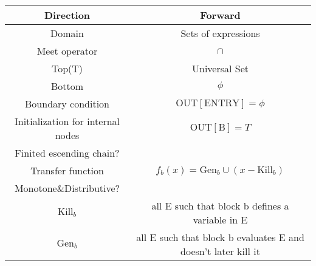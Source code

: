 \begin{center}
	\begin{tabular}{|c|c|}
		\hline Direction                         & Forward                                           \\
		\hline Domain                            & Sets of expressions                                    \\
		\hline Meet operator                     & \( \cap \)                                          \\
		\hline Top(T)                            & Universal Set                                             \\
		\hline Bottom                            & $\phi$                                     \\
		\hline Boundary condition                & $\mathrm{OUT[ENTRY]} = \phi$                          \\
		\hline Initialization for internal nodes & $\mathrm{OUT[B]} = T$                             \\
		\hline Finited escending chain?          & \checkmark                                          \\
		\hline Transfer function                 & $f_b(x) = \mathrm{Gen}_b \cup (x - \mathrm{Kill}_b)$ \\
		\hline Monotone\&Distributive?           & \checkmark                                          \\
		\hline $\mathrm{Kill}_b$ & all E such that block b defines a variable in E \\
    \hline $\mathrm{Gen}_b$ & all E such that block b evaluates E and doesn’t later kill it \\
    \hline
	\end{tabular}
\end{center}